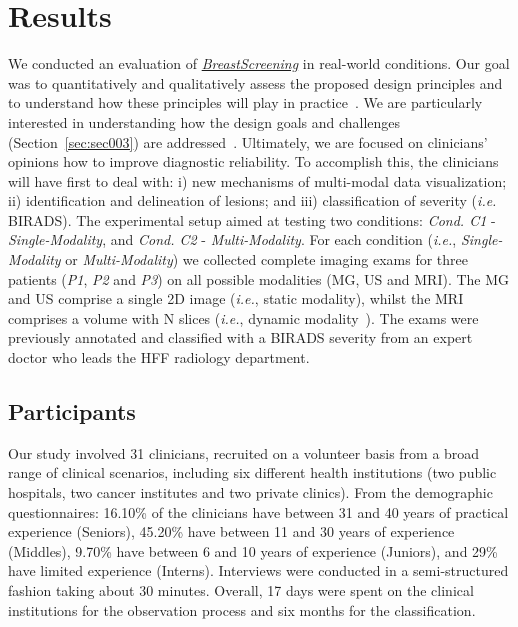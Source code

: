 \section{Results}
\label{sec:sec005}

We conducted an evaluation of \hyperlink{https://breastscreening.github.io/}{{\it BreastScreening}} in real-world conditions.
Our goal was to quantitatively and qualitatively assess the proposed design principles and to understand how these principles will play in practice~\cite{10.1145/3027063.3027103}.
We are particularly interested in understanding how
the design goals and challenges (Section~\ref{sec:sec003}) are addressed~\cite{Veeraraghavan2018}.
Ultimately, we are focused on clinicians' opinions how to improve diagnostic reliability.
To accomplish this, the clinicians will have first to deal with:
i) new mechanisms of multi-modal data visualization;
ii) identification and delineation of lesions; and
iii) classification of severity ({\em i.e.} BIRADS).
The experimental setup aimed at testing two conditions:
\textit{Cond. C1} - \textit{Single-Modality}, and
\textit{Cond. C2} - \textit{Multi-Modality}.
For each condition ({\it i.e.}, {\it Single-Modality} or {\it Multi-Modality}) we collected complete imaging exams for three patients (\textit{P1}, \textit{P2} and \textit{P3}) on all possible modalities (MG, US and MRI).
The MG and US comprise a single 2D image ({\em i.e.}, static modality), whilst the MRI~\cite{8759179, SANTIAGO20189} comprises a volume with N slices ({\em i.e.}, dynamic modality~\cite{8296581}).
The exams were previously annotated and classified with a BIRADS severity from an expert doctor who leads the HFF radiology department.

\subsection{Participants}

Our study involved 31 clinicians, recruited on a volunteer basis from a broad range of clinical scenarios, including six different health institutions (two public hospitals, two cancer institutes and two private clinics).
From the demographic questionnaires: 16.10\% of the clinicians have between 31 and 40 years of practical experience (Seniors), 45.20\% have between 11 and 30 years of experience (Middles), 9.70\% have between 6 and 10 years of experience (Juniors), and 29\% have limited experience (Interns).
Interviews were conducted in a semi-structured fashion taking about 30 minutes.
Overall, 17 days were spent on the clinical institutions for the observation process and six months for the classification.

